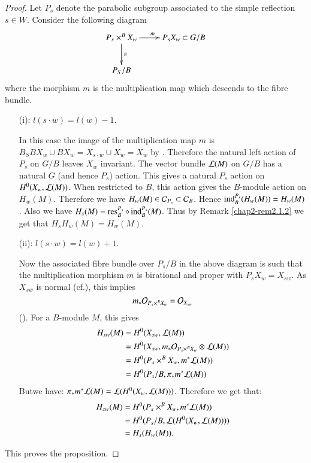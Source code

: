 \begin{proof}
Let $P_{s}$ denote the parabolic subgroup associated to the simple
reflection $s\in W$. Consider the following diagram
\[
\xymatrix{
P_{s}\times^{B}X_{w}\ar[d]^{\pi}\ar[r]^{m} & P_{s}X_{w}\subset G/B\\
P_{S}/B
}
\]
where the morphism $m$ is the multiplication map which descends to the
fibre bundle.
\begin{itemize}
\item[(i):] $l(s\cdot w)=l(w)-1$.

In this case the image of the multiplication map $m$ is
$B_{S}BX_{w}\cup BX_{w}=X_{s\cdot w}\cup X_{w}=X_{w}$ by
\cite[28.3]{key9}. Therefore the natural left action of $P_{s}$ on
$G/B$ leaves $X_{w}$ invariant. The vector bundle $\mathcal{L}(M)$ on $G/B$ has
a natural $G$ (and hence $P_{s}$) action. This gives a natural $P_{s}$
action on $H^{0}(X_{w},\mathcal{L}(M))$. When restricted to $B$, this action
gives the $B$-module action on $H_{w}(M)$. Therefore we have
$H_{w}(M)\in \mathcal{C}_{P_{s}}\subset \mathcal{C}_{B}$. Hence
$\operatorname{ind}^{P_{s}}_{B}(H_{w}(M))=H_{w}(M)$. Also we have
$H_{s}(M)=\operatorname{res}^{P_{s}}_{B}\circ \operatorname{ind}^{P_{s}}_{B}(M)$. Thus by Remark
\ref{chap2-rem2.1.2} we get that $H_{s}H_{w}(M)=H_{w}(M)$. 

\item[(ii):] $l(s\cdot w)=l(w)+1$.

Now the associated fibre bundle over $P_{s}/B$ in the above diagram is
such that the multiplication morphism $m$ is birational and proper
with $P_{s}X_{w}=X_{sw}$. As $X_{sw}$ is normal (cf.\@ \cite{key25}),
this implies 
$$
m_{\ast}\mathcal{O}_{P_{s}\times^{B}X_{w}}=\mathcal{O}_{X_{sw}}
$$ 
(\cite[II Lemma 14.5]{key11}). For a $B$-module $M$, this gives
\begin{align*}
H_{sw}(M) &= H^{0}(X_{sw},\mathcal{L}(M))\\
&= H^{0}(X_{sw},m_{\ast}\mathcal{O}_{P_{s}\times^{B}X_{w}}\otimes \mathcal{L}(M))\\
&= H^{0}(P_{s}\times^{B}X_{w},m^{\ast}\mathcal{L}(M))\\
&= H^{0}(P_{s}/B,\pi_{\ast}m^{\ast}\mathcal{L}(M)) 
\end{align*}
But\pageoriginale we have:
$\pi_{\ast}m^{\ast}\mathcal{L}(M)=\mathcal{L}(H^{0}(X_{w},\mathcal{L}(M)))$. Therefore we get
that:\label{page15}
\begin{align*}
H_{sw}(M) &= H^{0}(P_{s}\times^{B}X_{w},m^{\ast}\mathcal{L}(M))\\
&= H^{0}(P_{s}/B,\mathcal{L}(H^{0}(X_{w},\mathcal{L}(M))))\\
&= H_{s}(H_{w}(M)).
\end{align*}
\end{itemize}

This proves the proposition.
\end{proof}

